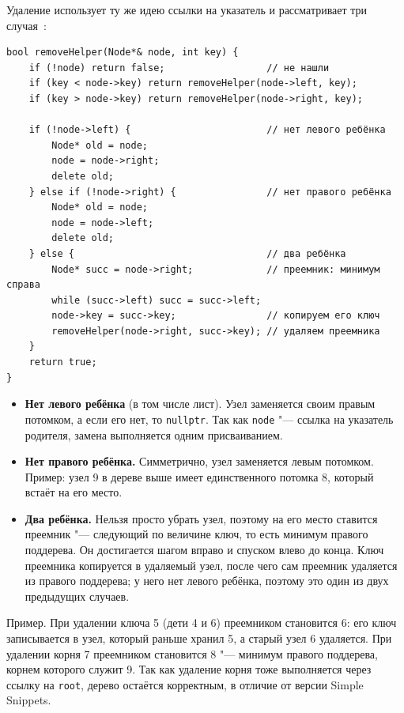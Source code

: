 \documentclass[otchet]{SCWorks}
\begin{document}
Удаление использует ту же идею ссылки на указатель и рассматривает три
случая~\cite{kormen}:

\begin{verbatim}
bool removeHelper(Node*& node, int key) {
    if (!node) return false;                  // не нашли
    if (key < node->key) return removeHelper(node->left, key);
    if (key > node->key) return removeHelper(node->right, key);

    if (!node->left) {                        // нет левого ребёнка
        Node* old = node;
        node = node->right;
        delete old;
    } else if (!node->right) {                // нет правого ребёнка
        Node* old = node;
        node = node->left;
        delete old;
    } else {                                  // два ребёнка
        Node* succ = node->right;             // преемник: минимум справа
        while (succ->left) succ = succ->left;
        node->key = succ->key;                // копируем его ключ
        removeHelper(node->right, succ->key); // удаляем преемника
    }
    return true;
}
\end{verbatim}

\begin{itemize}
  \item \textbf{Нет левого ребёнка} (в том числе лист). Узел заменяется
        своим правым потомком, а если его нет, то \texttt{nullptr}. Так как
        \texttt{node} "--- ссылка на указатель родителя, замена выполняется
        одним присваиванием.
  \item \textbf{Нет правого ребёнка.} Симметрично, узел заменяется левым
        потомком. Пример: узел 9 в дереве выше имеет единственного потомка 8,
        который встаёт на его место.
  \item \textbf{Два ребёнка.} Нельзя просто убрать узел, поэтому на его
        место ставится преемник "--- следующий по величине ключ, то есть
        минимум правого поддерева. Он достигается шагом вправо и спуском
        влево до конца. Ключ преемника копируется в удаляемый узел, после
        чего сам преемник удаляется из правого поддерева; у него нет левого
        ребёнка, поэтому это один из двух предыдущих случаев.
\end{itemize}

Пример. При удалении ключа 5 (дети 4 и 6) преемником становится 6: его
ключ записывается в узел, который раньше хранил 5, а старый узел 6
удаляется. При удалении корня 7 преемником становится 8 "--- минимум
правого поддерева, корнем которого служит 9. Так как удаление корня тоже
выполняется через ссылку на \texttt{root}, дерево остаётся корректным,
в отличие от версии Simple Snippets.
\end{document}
